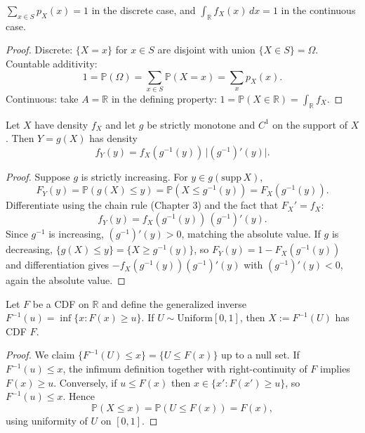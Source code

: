 \begin{theorem}[Normalization]
$\sum_{x \in S} p_X(x) = 1$ in the discrete case, and $\int_{\mathbb{R}} f_X(x)\,dx = 1$ in the continuous case.
\end{theorem}

\begin{proof}
Discrete: $\{X = x\}$ for $x \in S$ are disjoint with union $\{X \in S\} = \Omega$. Countable additivity:
\[
1 = \mathbb{P}(\Omega) = \sum_{x \in S} \mathbb{P}(X = x) = \sum_x p_X(x).
\]
Continuous: take $A = \mathbb{R}$ in the defining property: $1 = \mathbb{P}(X \in \mathbb{R}) = \int_\mathbb{R} f_X$.
\end{proof}

\begin{theorem}
Let $X$ have density $f_X$ and let $g$ be strictly monotone and $C^1$ on the support of $X$. Then $Y = g(X)$ has density
\[
f_Y(y) = f_X(g^{-1}(y))\,\bigl|(g^{-1})'(y)\bigr|.
\]
\end{theorem}

\begin{proof}
Suppose $g$ is strictly increasing. For $y \in g(\text{supp}\, X)$,
\[
F_Y(y) = \mathbb{P}(g(X) \leq y) = \mathbb{P}(X \leq g^{-1}(y)) = F_X(g^{-1}(y)).
\]
Differentiate using the chain rule (Chapter 3) and the fact that $F_X' = f_X$:
\[
f_Y(y) = f_X(g^{-1}(y))\,(g^{-1})'(y).
\]
Since $g^{-1}$ is increasing, $(g^{-1})'(y) > 0$, matching the absolute value. If $g$ is decreasing, $\{g(X) \leq y\} = \{X \geq g^{-1}(y)\}$, so $F_Y(y) = 1 - F_X(g^{-1}(y))$ and differentiation gives $-f_X(g^{-1}(y))(g^{-1})'(y)$ with $(g^{-1})'(y) < 0$, again the absolute value.
\end{proof}

\begin{theorem}
Let $F$ be a CDF on $\mathbb{R}$ and define the generalized inverse $F^{-1}(u) = \inf\{x : F(x) \geq u\}$. If $U \sim \mathrm{Uniform}[0,1]$, then $X := F^{-1}(U)$ has CDF $F$.
\end{theorem}

\begin{proof}
We claim $\{F^{-1}(U) \leq x\} = \{U \leq F(x)\}$ up to a null set. If $F^{-1}(u) \leq x$, the infimum definition together with right-continuity of $F$ implies $F(x) \geq u$. Conversely, if $u \leq F(x)$ then $x \in \{x' : F(x') \geq u\}$, so $F^{-1}(u) \leq x$. Hence
\[
\mathbb{P}(X \leq x) = \mathbb{P}(U \leq F(x)) = F(x),
\]
using uniformity of $U$ on $[0,1]$.
\end{proof}

